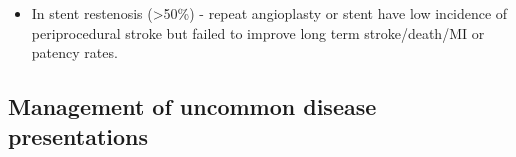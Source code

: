 \documentclass[
]{book}
\providecommand{\tightlist}{%
  \setlength{\itemsep}{0pt}\setlength{\parskip}{0pt}}
\begin{document}
\begin{itemize}
  \begin{itemize}
  \tightlist
  \item
    In stent restenosis (\textgreater50\%) - repeat angioplasty or stent have
    low incidence of periprocedural stroke but failed to improve
    long term stroke/death/MI or patency rates.
    \citep{chungPercutaneousInterventionCarotid2016a}
  \end{itemize}
\end{itemize}

\hypertarget{management-of-uncommon-disease-presentations}{%
\subsection{Management of uncommon disease presentations}\label{management-of-uncommon-disease-presentations}}
\end{document}
